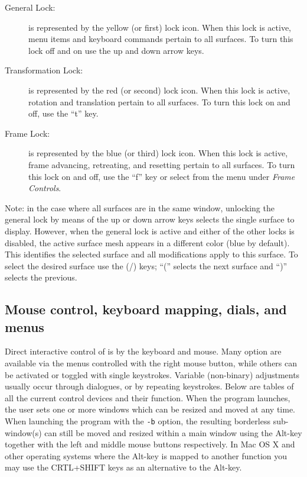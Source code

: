 \begin{description}
  \item [General Lock:] is represented by the yellow (or first) lock icon.  
        When this lock is active, menu items and keyboard commands pertain 
        to all surfaces.  To turn this lock off and on use the up
        and down arrow keys.
  \item [Transformation Lock: ] is represented by the red (or second) 
        lock icon.  When this lock is active, rotation and translation 
        pertain to all surfaces. To turn this lock on and off, use the
        ``t'' key.
  \item [Frame Lock: ] is represented by the blue (or third) lock icon.
        When this lock is active, frame advancing, retreating, and resetting
        pertain to all surfaces.  To turn this lock on and off, use the
        ``f'' key or select from the menu under \emph{Frame Controls}.
\end{description}

Note: in the case where all surfaces are in the same window, unlocking the
general lock by means of the up or down arrow keys selects the single
surface to display.  However, when the general lock is active and either of
the other locks is disabled, the active surface mesh appears in a different
color (blue by default).  This identifies the selected surface and all
modifications apply to this surface.  To select the desired surface use the
(/) keys; ``('' selects the next surface and ``)'' selects the previous.




\subsection{Mouse control, keyboard mapping, dials, and menus}
 
Direct interactive control of \map{} is by the keyboard and mouse.
Many option are available via the menus controlled with the right mouse
button, while others can be activated or toggled with single keystrokes.
Variable (non-binary) adjustments usually occur 
through dialogues, or by repeating keystrokes.  Below are tables of all the
current control devices and their function.  When the program launches, the
user sets one or more windows which can be resized and moved at any time.
When launching the program with the {\tt -b} option, the resulting
borderless sub-window(s) can still be moved and resized within a main
window using the Alt-key together with the left and middle mouse buttons
respectively.  In Mac OS X and other operating systems where the Alt-key is
mapped to another function you may use the CRTL+SHIFT keys as an
alternative to the Alt-key.


